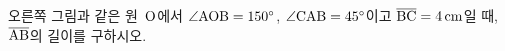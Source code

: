 \noindent\begin{minipage}[t]{0.58\linewidth}\vspace{0pt}\raggedright 오른쪽 그림과 같은 원~$\mathrm{O}$에서 $\angle\mathrm{AOB}=150^\circ$, $\angle\mathrm{CAB}=45^\circ$이고 $\overline{\mathrm{BC}}=4\,\mathrm{cm}$일 때, $\overline{\mathrm{AB}}$의 길이를 구하시오.\end{minipage}\hfill\begin{minipage}[t]{0.4\linewidth}\vspace{0pt}\centering \resizebox{\ifdim\width>\linewidth\linewidth\else\width\fi}{!}{}\end{minipage}\par
